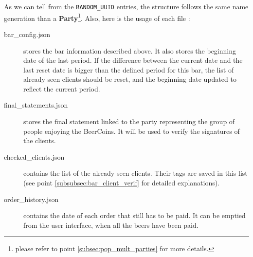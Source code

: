 \begin{center}
	\begin{minipage}[c]{0.5\textwidth}
	\end{minipage}
\end{center}
As we can tell from the \texttt{RANDOM\_UUID} entries, the structure follows the same name generation than a \textbf{Party}\footnote{please refer to point \ref{subsec:pop_mult_parties} for more details.}. Also, here is the usage of each file :
\begin{description}
	\item[bar\_config.json] stores the bar information described above. It also stores the beginning date of the last period. If the difference between the current date and the last reset date is bigger than the defined period for this bar, the list of already seen clients should be reset, and the beginning date updated to reflect the current period.
	\item [final\_statements.json] stores the final statement linked to the party re\-presenting the group of people enjoying the BeerCoins. It will be used to verify the signatures of the clients.
	\item[checked\_clients.json] contains the list of the already seen clients. Their tags are saved in this list (see point \ref{subsubsec:bar_client_verif} for detailed explanations).
	\item[order\_history.json] contains the date of each order that still has to be paid. It can be emptied from the user interface, when all the beers have been paid.
\end{description}

